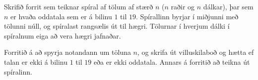 \begin{problem}
	Skrifið forrit sem teiknar spíral af tölum af stærð $n$ ($n$ raðir og $n$ dálkar), þar sem $n$ er hvaða oddatala sem er á bilinu $1$ til $19$. Spírallinn byrjar í miðjunni með tölunni núll, og spíralast rangsælis út til hægri. Tölurnar í hverjum dálki í spíralnum eiga að vera hægri jafnaðar.

	Forritið á að spyrja notandann um töluna $n$, og skrifa út villuskilaboð og hætta ef talan er ekki á bilinu $1$ til $19$ eða er ekki oddatala. Annars á forritið að teikna út spíralinn.

\begin{example}
%
\end{example}
\begin{example}
%
\end{example}
\begin{example}
%
\end{example}
\begin{example}
%
\end{example}
\end{problem}